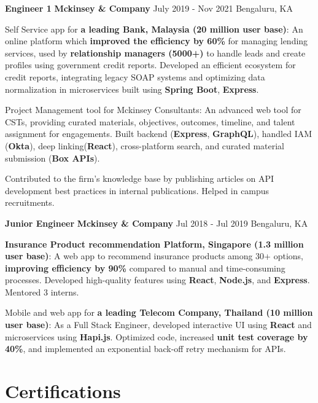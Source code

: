 \documentclass[letterpaper]{resume_config}
\begin{document}
\WorkExperience
    {\textbf{Engineer 1}} %
    {\textbf{Mckinsey \& Company}} %
    {July 2019 - Nov 2021} %
    {Bengaluru, KA} %
{
    \item Self Service app for \textbf{a leading Bank, Malaysia (20 million user base)}: An online platform which \textbf{improved the efficiency by 60\%} for managing lending services, used by \textbf{relationship managers (5000+)} to handle leads and create profiles using government credit reports. Developed an efficient ecosystem for credit reports, integrating legacy SOAP systems and optimizing data normalization in microservices 
 built using \textbf{Spring Boot}, \textbf{Express}.
    \item Project Management tool for Mckinsey Consultants: An advanced web tool for CSTs, providing curated materials, objectives, outcomes, timeline, and talent assignment for engagements. Built backend (\textbf{Express}, \textbf{GraphQL}), handled IAM (\textbf{Okta}), deep linking(\textbf{React}), cross-platform search, and curated material submission (\textbf{Box APIs}).
    \item Contributed to the firm's knowledge base by publishing articles on API development best practices in internal publications. Helped in campus recruitments.
    }
    
\WorkExperience
    {\textbf{Junior Engineer}} %
    {\textbf{Mckinsey \& Company}} %
    {Jul 2018 - Jul 2019} %
    {Bengaluru, KA} %
    {
            \item \textbf{Insurance Product recommendation Platform, Singapore (1.3 million user base)}: A web app to recommend insurance products among 30+ options, \textbf{improving efficiency by 90\%} compared to manual and time-consuming processes. Developed high-quality features using \textbf{React}, \textbf{Node.js}, and \textbf{Express}. Mentored 3 interns.
            \item Mobile and web app for \textbf{a leading Telecom Company, Thailand (10 million user base)}: As a Full Stack Engineer, developed interactive UI using \textbf{React} and microservices using \textbf{Hapi.js}. Optimized code, increased \textbf{unit test coverage by 40\%}, and implemented an exponential back-off retry mechanism for APIs.
 }
    

\section{\textcolor{NavyBlue}{Certifications}}
\end{document}
